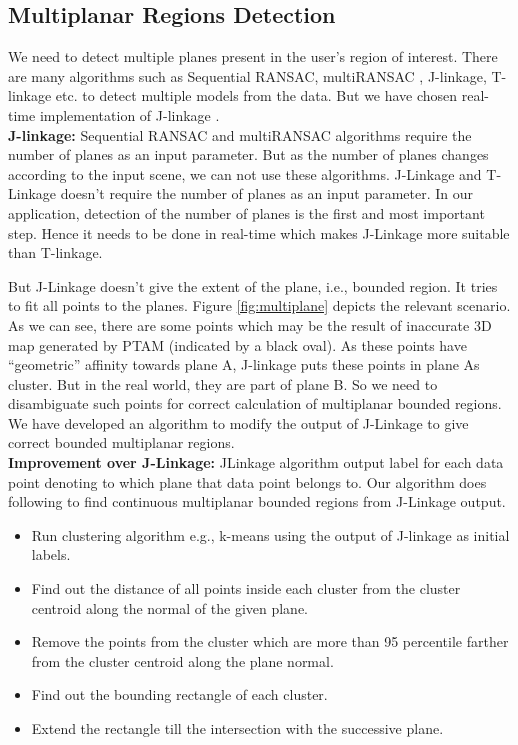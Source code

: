 \subsection{Multiplanar Regions Detection}
We need to detect multiple planes present in the user's region of
interest. There are many algorithms such as Sequential RANSAC\cite{Kanazawa},
multiRANSAC\cite{zuliani} , J-linkage\cite{jlinkage}, T-linkage\cite{tlinkage}
etc. to detect multiple models from the data. But we have chosen real-time
implementation of J-linkage \cite{realtimejlinkage}.\\
\textbf{J-linkage:} Sequential RANSAC and multiRANSAC algorithms require
the number of planes as an input parameter. But as the number of planes changes
according to the input scene, we can not use these algorithms. J-Linkage and T-Linkage
doesn't require the number of planes as an input parameter. 
In our application, detection of the number of planes is the first and most
important step. Hence it needs to be done in real-time which makes J-Linkage
more suitable than T-linkage.

But J-Linkage doesn't give the extent of the plane, i.e., bounded
region. It tries to fit all points to the planes. Figure \ref{fig:multiplane}
depicts the relevant scenario. As we can see, there are some points which may
be the result of inaccurate 3D map generated by PTAM (indicated by a black oval).
As these points have ``geometric'' affinity towards plane A, J-linkage puts these
points in plane A\textquotesingle s cluster. But in the real world, they are part
of plane B.
So we need to disambiguate such points for correct calculation of multiplanar
bounded regions. We have developed an algorithm to modify the output of
J-Linkage to give correct bounded multiplanar regions.\\
\textbf{Improvement over J-Linkage:} JLinkage algorithm output label
for each data point denoting to which plane that data point belongs to. Our
algorithm does following to find continuous multiplanar bounded regions from J-Linkage
output.
\begin{itemize}
  \item Run clustering algorithm e.g., k-means using the output of J-linkage
  as initial labels.
  \item Find out the distance of all points inside each cluster from the cluster
  centroid along the normal of the given plane.
  \item Remove the points from the cluster which are more than 95 percentile
  farther from the cluster centroid along the plane normal.
  \item Find out the bounding rectangle of each cluster.
  \item Extend the rectangle till the intersection with the successive plane.
\end{itemize}

